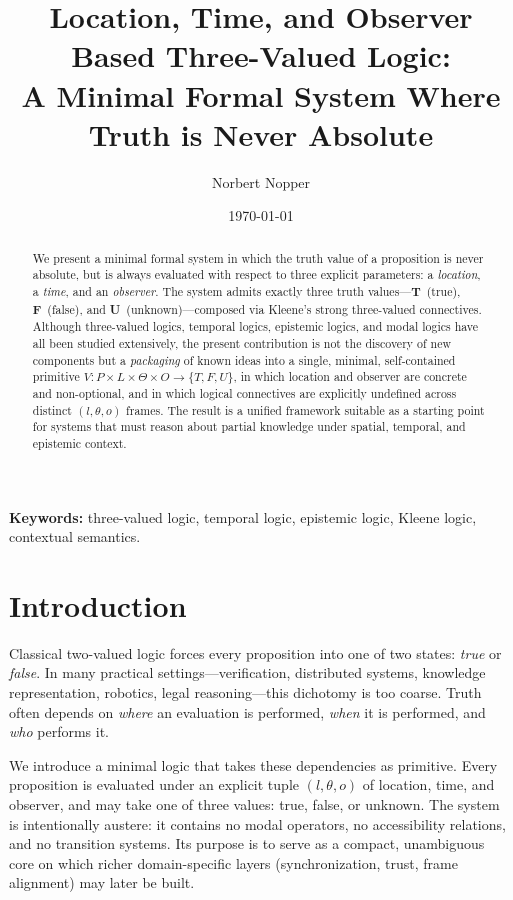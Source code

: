 \documentclass[11pt,a4paper]{article}
\title{Location, Time, and Observer Based Three-Valued Logic:\\
A Minimal Formal System Where Truth is Never Absolute}
\author{Norbert Nopper}
\date{\today}
\begin{document}
\maketitle

\begin{abstract}
\noindent
We present a minimal formal system in which the truth value of a proposition
is never absolute, but is always evaluated with respect to three explicit
parameters: a \emph{location}, a \emph{time}, and an \emph{observer}.
The system admits exactly three truth values---\textbf{T}~(true),
\textbf{F}~(false), and \textbf{U}~(unknown)---composed via Kleene's strong
three-valued connectives. Although three-valued logics, temporal logics,
epistemic logics, and modal logics have all been studied extensively, the
present contribution is not the discovery of new components but a
\emph{packaging} of known ideas into a single, minimal, self-contained primitive
$V : P \times L \times \Theta \times O \to \{T, F, U\}$, in which location and
observer are concrete and non-optional, and in which logical connectives are
explicitly undefined across distinct $(l, \theta, o)$ frames. The result is a
unified framework suitable as a starting point for systems that must reason
about partial knowledge under spatial, temporal, and epistemic context.
\end{abstract}

\noindent\textbf{Keywords:} three-valued logic, temporal logic, epistemic logic,
Kleene logic, contextual semantics.

\section{Introduction}
Classical two-valued logic forces every proposition into one of two states:
\emph{true} or \emph{false}. In many practical settings---verification,
distributed systems, knowledge representation, robotics, legal reasoning---this
dichotomy is too coarse. Truth often depends on \emph{where} an evaluation is
performed, \emph{when} it is performed, and \emph{who} performs it.

We introduce a minimal logic that takes these dependencies as primitive.
Every proposition is evaluated under an explicit tuple
$(l, \theta, o)$ of location, time, and observer, and may take one of three
values: true, false, or unknown. The system is intentionally austere: it
contains no modal operators, no accessibility relations, and no transition
systems. Its purpose is to serve as a compact, unambiguous core on which richer
domain-specific layers (synchronization, trust, frame alignment) may later be
built.
\end{document}
